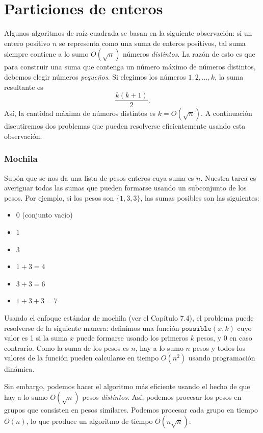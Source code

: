 \section{Particiones de enteros}

Algunos algoritmos de raíz cuadrada se basan en
la siguiente observación:
si un entero positivo $n$ se representa como
una suma de enteros positivos,
tal suma siempre contiene a lo sumo
$O(\sqrt n)$ números \emph{distintos}.
La razón de esto es que para construir
una suma que contenga un número máximo de números
distintos, debemos elegir números \emph{pequeños}.
Si elegimos los números $1,2,\ldots,k$,
la suma resultante es
\[\frac{k(k+1)}{2}.\]
Así, la cantidad máxima de números distintos es $k = O(\sqrt n)$.
A continuación discutiremos dos problemas que pueden resolverse
eficientemente usando esta observación.

\subsubsection{Mochila}

Supón que se nos da una lista de pesos enteros
cuya suma es $n$.
Nuestra tarea es averiguar todas las sumas que pueden formarse usando
un subconjunto de los pesos. Por ejemplo, si los pesos son
$\{1,3,3\}$, las sumas posibles son las siguientes:

\begin{itemize}[noitemsep]
\item $0$ (conjunto vacío)
\item $1$
\item $3$
\item $1+3=4$
\item $3+3=6$
\item $1+3+3=7$
\end{itemize}

Usando el enfoque estándar de mochila (ver el Capítulo 7.4),
el problema puede resolverse de la siguiente manera:
definimos una función $\texttt{possible}(x,k)$ cuyo valor es 1
si la suma $x$ puede formarse usando los primeros $k$ pesos,
y 0 en caso contrario.
Como la suma de los pesos es $n$,
hay a lo sumo $n$ pesos y
todos los valores de la función pueden calcularse
en tiempo $O(n^2)$ usando programación dinámica.

Sin embargo, podemos hacer el algoritmo más eficiente
usando el hecho de que hay a lo sumo $O(\sqrt n)$
pesos \emph{distintos}.
Así, podemos procesar los pesos en grupos
que consisten en pesos similares.
Podemos procesar cada grupo
en tiempo $O(n)$, lo que produce un algoritmo de tiempo $O(n \sqrt n)$.

